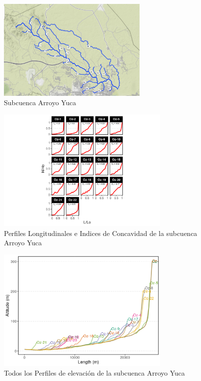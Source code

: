 \documentclass[11pt,]{article}
\begin{document}
\begin{figure}
\centering
\includegraphics[width=0.65000\textwidth]{Productos Generados/p_yuca.png}
\caption{\label{fig:LFP_Yuca0} Subcuenca Arroyo Yuca}
\end{figure}

\begin{figure}
\centering
\includegraphics[width=0.75000\textwidth]{Productos Generados/p_c_yuca1.png}
\caption{\label{fig:LFP_Yuca1} Perfiles Longitudinales e Indices de
Concavidad de la subcuenca Arroyo Yuca}
\end{figure}

\begin{figure}
\centering
\includegraphics[width=0.75000\textwidth]{Productos Generados/p_c_yuca.png}
\caption{\label{fig:LFP_Yuca2} Todos los Perfiles de elevación de la
subcuenca Arroyo Yuca}
\end{figure}
\end{document}

